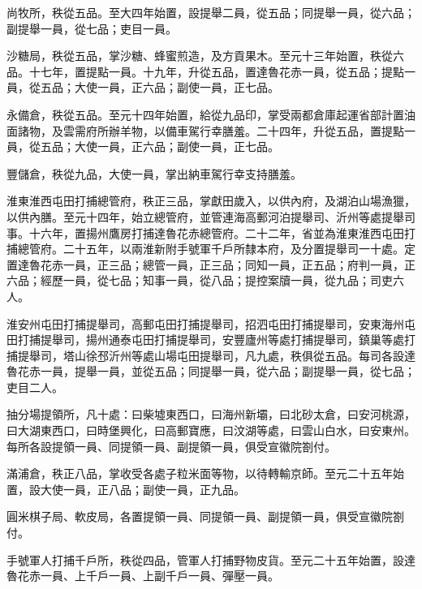 \begin{pinyinscope}
 尚牧所，秩從五品。至大四年始置，設提舉二員，從五品；同提舉一員，從六品；副提舉一員，從七品；吏目一員。



 沙糖局，秩從五品，掌沙糖、蜂蜜煎造，及方貢果木。至元十三年始置，秩從六品。十七年，置提點一員。十九年，升從五品，置達魯花赤一員，從五品；提點一員，從五品；大使一員，正六品；副使一員，正七品。



 永備倉，秩從五品。至元十四年始置，給從九品印，掌受兩都倉庫起運省部計置油面諸物，及雲需府所辦羊物，以備車駕行幸膳羞。二十四年，升從五品，置提點一員，從五品；大使一員，正六品；副使一員，正七品。



 豐儲倉，秩從九品，大使一員，掌出納車駕行幸支持膳羞。



 淮東淮西屯田打捕總管府，秩正三品，掌獻田歲入，以供內府，及湖泊山場漁獵，以供內膳。至元十四年，始立總管府，並管連海高郵河泊提舉司、沂州等處提舉司事。十六年，置揚州鷹房打捕達魯花赤總管府。二十二年，省並為淮東淮西屯田打捕總管府。二十五年，以兩淮新附手號軍千戶所隸本府，及分置提舉司一十處。定置達魯花赤一員，正三品；總管一員，正三品；同知一員，正五品；府判一員，正六品；經歷一員，從七品；知事一員，從八品；提控案牘一員，從九品；司吏六人。



 淮安州屯田打捕提舉司，高郵屯田打捕提舉司，招泗屯田打捕提舉司，安東海州屯田打捕提舉司，揚州通泰屯田打捕提舉司，安豐廬州等處打捕提舉司，鎮巢等處打捕提舉司，塔山徐邳沂州等處山場屯田提舉司，凡九處，秩俱從五品。每司各設達魯花赤一員，提舉一員，並從五品；同提舉一員，從六品；副提舉一員，從七品；吏目二人。



 抽分場提領所，凡十處：曰柴墟東西口，曰海州新壩，曰北砂太倉，曰安河桃源，曰大湖東西口，曰時堡興化，曰高郵寶應，曰汶湖等處，曰雲山白水，曰安東州。每所各設提領一員、同提領一員、副提領一員，俱受宣徽院劄付。



 滿浦倉，秩正八品，掌收受各處子粒米面等物，以待轉輸京師。至元二十五年始置，設大使一員，正八品；副使一員，正九品。



 圓米棋子局、軟皮局，各置提領一員、同提領一員、副提領一員，俱受宣徽院劄付。



 手號軍人打捕千戶所，秩從四品，管軍人打捕野物皮貨。至元二十五年始置，設達魯花赤一員、上千戶一員、上副千戶一員、彈壓一員。




\end{pinyinscope}
